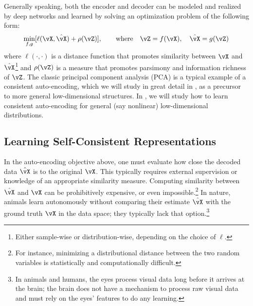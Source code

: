 \documentclass[../../book-main.tex]{subfiles}
\begin{document}
Generally speaking, both the encoder and decoder can be modeled and
realized by deep networks and learned by solving an optimization
problem of the following form:
\begin{equation}
    \min_{f, g} [\ell(\vX, \hat{\vX}) + \rho(\vZ)], \qquad
    \text{where} \quad \vZ = f(\vX), \quad \hat{\vX} = g(\vZ)
    \label{eqn:auto-encoding-objective}
\end{equation}
where \(\ell(\cdot, \cdot)\) is a distance function that promotes
similarity between \(\vX\) and \(\hat{\vX}\)\footnote{Either
    sample-wise or distribution-wise, depending on the choice of
\(\ell\).} and \(\rho(\vZ)\) is a measure that promotes parsimony and
information richness of \(\vZ\). The classic principal component
analysis (PCA) \cite{JolliffeI2002} is a typical example of a
consistent auto-encoding, which we will study in great detail in
, as a precursor to more general low-dimensional
structures. In , we will study how to learn
consistent auto-encoding for general (say nonlinear) low-dimensional
distributions.

\subsection{Learning Self-Consistent Representations}
In the auto-encoding objective above, one must evaluate how close the
decoded data \(\hat{\vX}\) is to the original \(\vX\). This typically
requires external supervision or knowledge of an appropriate
similarity measure. Computing similarity between \(\hat{\vX}\) and
\(\vX\) can be prohibitively expensive, or even
impossible.\footnote{For instance, minimizing a distributional
    distance between the two random variables is statistically and
computationally difficult.} In nature, animals learn autonomously
without comparing their estimate \(\hat{\vX}\) with the ground truth
\(\vX\) in the data space; they typically lack that
option.\footnote{In animals and humans, the eyes process visual data
    long before it arrives at the brain; the brain does not have a
    mechanism to process raw visual data and must rely on the eyes'
features to do any learning.}
\end{document}
